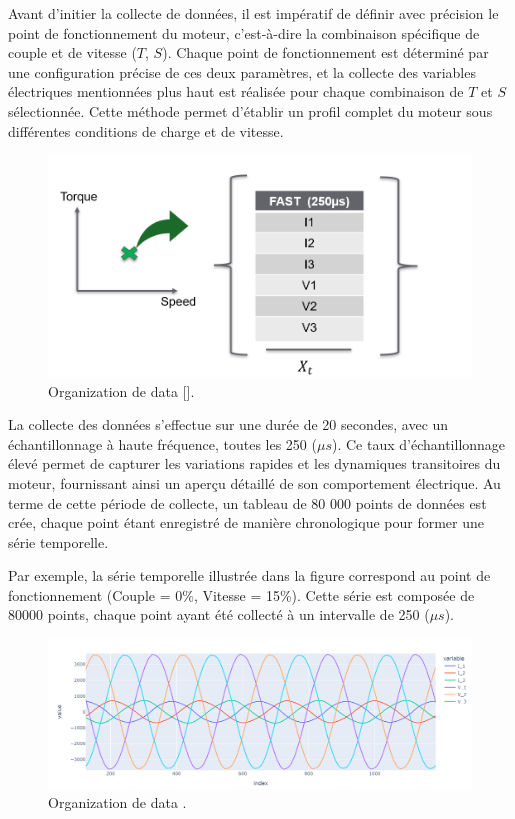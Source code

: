 Avant d'initier la collecte de données, il est impératif de définir avec
précision le point de fonctionnement du moteur, c'est-à-dire la combinaison
spécifique de couple et de vitesse (\(T\), \(S\)). Chaque point de
fonctionnement est déterminé par une configuration précise de ces deux
paramètres, et la collecte des variables électriques mentionnées plus haut est
réalisée pour chaque combinaison de \(T\) et \(S\) sélectionnée. Cette méthode
permet d'établir un profil complet du moteur sous différentes conditions de
charge et de vitesse.

\begin{figure}[hbt!]
  \centering
  \includegraphics[width=12cm]{images_pfe/speed_couple.png}
  \caption{Organization de data [\cite{yoon2019time}].}
  \label{fig:speed_couple}
\end{figure}
\FloatBarrier

La collecte des données s'effectue sur une durée de 20 secondes, avec un
échantillonnage à haute fréquence, toutes les 250 (\(\mu s\)). Ce taux
d'échantillonnage élevé permet de capturer les variations rapides et les
dynamiques transitoires du moteur, fournissant ainsi un aperçu détaillé de son
comportement électrique. Au terme de cette période de collecte, un tableau de
80 000 points de données est crée, chaque point étant enregistré de manière
chronologique pour former une série temporelle.

Par exemple, la série temporelle illustrée dans la figure correspond au point
de fonctionnement (Couple = 0\%, Vitesse = 15\%). Cette série est composée de
80000 points, chaque point ayant été collecté à un intervalle de 250 (\(\mu
s\)).

\begin{figure}[hbt!]
  \centering
  \includegraphics[width=12cm]{images_pfe/V_I_data.png}
  \caption{Organization de data .}
  \label{fig:data_v_i}
\end{figure}
\FloatBarrier


